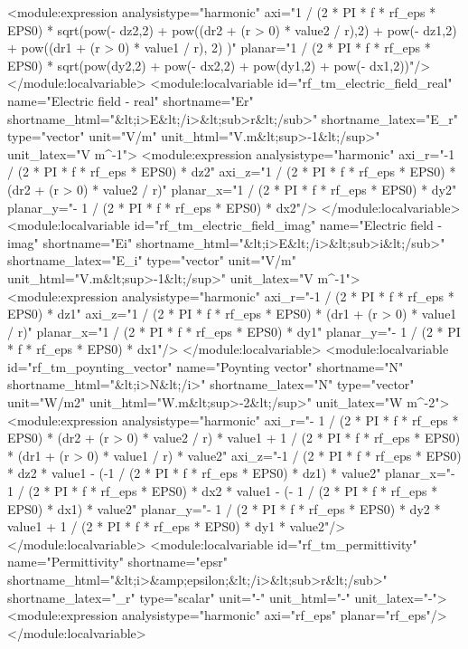 \documentclass[12pt,a4paper,oneside]{article}
\numberwithin{equation}{section} %
\numberwithin{figure}{section} %
\numberwithin{table}{section} %
\begin{document}
\begin{spverbatim}
      <module:expression analysistype="harmonic" axi="1 / (2 * PI * f * rf_eps * EPS0) * sqrt(pow(- dz2,2) + pow((dr2 + (r > 0) * value2 / r),2) + pow(- dz1,2) + pow((dr1 + (r > 0) * value1 / r), 2) )" planar="1 / (2 * PI * f * rf_eps * EPS0) * sqrt(pow(dy2,2) + pow(- dx2,2) + pow(dy1,2) + pow(- dx1,2))"/>
    </module:localvariable>
    <module:localvariable id="rf_tm_electric_field_real" name="Electric field - real" shortname="Er" shortname_html="&lt;i>E&lt;/i>&lt;sub>r&lt;/sub>" shortname_latex="E_{r}" type="vector" unit="V/m" unit_html="V.m&lt;sup>-1&lt;/sup>" unit_latex="V \cdot m^{-1}">
      <module:expression analysistype="harmonic" axi_r="-1 / (2 * PI * f * rf_eps * EPS0) * dz2" axi_z="1 / (2 * PI * f * rf_eps * EPS0) * (dr2 + (r > 0) * value2 / r)" planar_x="1 / (2 * PI * f * rf_eps * EPS0) * dy2" planar_y="- 1 / (2 * PI * f * rf_eps * EPS0) * dx2"/>
    </module:localvariable>
    <module:localvariable id="rf_tm_electric_field_imag" name="Electric field - imag" shortname="Ei" shortname_html="&lt;i>E&lt;/i>&lt;sub>i&lt;/sub>" shortname_latex="E_{i}" type="vector" unit="V/m" unit_html="V.m&lt;sup>-1&lt;/sup>" unit_latex="V \cdot m^{-1}">
      <module:expression analysistype="harmonic" axi_r="-1 / (2 * PI * f * rf_eps * EPS0) * dz1" axi_z="1 / (2 * PI * f * rf_eps * EPS0) * (dr1 + (r > 0) * value1 / r)" planar_x="1 / (2 * PI * f * rf_eps * EPS0) * dy1" planar_y="- 1 / (2 * PI * f * rf_eps * EPS0) * dx1"/>
    </module:localvariable>
    <module:localvariable id="rf_tm_poynting_vector" name="Poynting vector" shortname="N" shortname_html="&lt;i>N&lt;/i>" shortname_latex="N" type="vector" unit="W/m2" unit_html="W.m&lt;sup>-2&lt;/sup>" unit_latex="W \cdot m^{-2}">
      <module:expression analysistype="harmonic" axi_r="- 1 / (2 * PI * f * rf_eps * EPS0) * (dr2 + (r > 0) * value2 / r) * value1 + 1 / (2 * PI * f * rf_eps * EPS0) * (dr1 + (r > 0) * value1 / r) * value2" axi_z="-1 / (2 * PI * f * rf_eps * EPS0) * dz2 * value1 - (-1 / (2 * PI * f * rf_eps * EPS0) * dz1) * value2" planar_x="- 1 / (2 * PI * f * rf_eps * EPS0) * dx2 * value1 - (- 1 / (2 * PI * f * rf_eps * EPS0) * dx1) * value2" planar_y="- 1 / (2 * PI * f * rf_eps * EPS0) * dy2 * value1 + 1 / (2 * PI * f * rf_eps * EPS0) * dy1 * value2"/>
    </module:localvariable>
    <module:localvariable id="rf_tm_permittivity" name="Permittivity" shortname="epsr" shortname_html="&lt;i>&amp;epsilon;&lt;/i>&lt;sub>r&lt;/sub>" shortname_latex="\varepsilon_{r}" type="scalar" unit="-" unit_html="-" unit_latex="-">
      <module:expression analysistype="harmonic" axi="rf_eps" planar="rf_eps"/>
    </module:localvariable>

\end{spverbatim}
\end{document}
